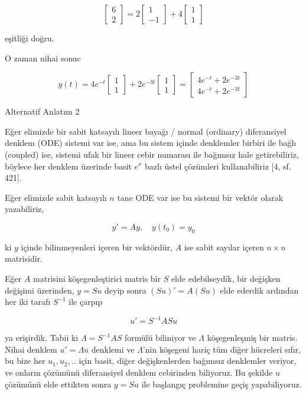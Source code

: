 \documentclass[12pt,fleqn]{article}\usepackage{../../common}
\begin{document}
$$
\left[\begin{array}{r}
6 \\ 2
\end{array}\right] =
2 
\left[\begin{array}{r}
1 \\ -1
\end{array}\right] +
4 
\left[\begin{array}{r}
1 \\ 1
\end{array}\right] 
$$

eşitliği doğru. 

O zaman nihai sonuc

$$
y(t) =
4 e^{-t}
\left[\begin{array}{r}
1 \\ 1
\end{array}\right]  +
2 e^{-3t}
\left[\begin{array}{r}
1 \\ 1
\end{array}\right] =
\left[\begin{array}{r}
4 e^{-t} + 2 e^{-3t} \\
4 e^{-t} + 2 e^{-3t}
\end{array}\right]
$$

Alternatif Anlatım 2

Eğer elimizde bir sabit katsayılı lineer bayağı / normal (ordinary) diferansiyel
denklem (ODE) sistemi var ise, ama bu sistem içinde denklemler birbiri ile bağlı
(coupled) ise, sistemi ufak bir lineer cebir numarası ile bağımsız hale
getirebiliriz, böylece her denklem üzerinde basit $e^x$ bazlı üstel çözümleri
kullanabiliriz [4, sf. 421].

Eğer elimizde sabit katsayılı $n$ tane ODE var ise bu sistemi bir vektör
olarak yazabiliriz,

$$
y' = A y, \quad y(t_0) = y_0
$$

ki $y$ içinde bilinmeyenleri içeren bir vektördür, $A$ ise sabit sayılar
içeren $n \times n$ matrisidir.

Eğer $A$ matrisini köşegenleştirici matris bir $S$ elde edebilseydik, bir
değişken değişimi üzerinden, $y = Su$ deyip sonra $(Su)' = A(Su)$ elde
ederdik ardından her iki tarafı $S^{-1}$ ile çarpıp

$$
u' = S^{-1} A S u
$$

ya erişirdik. Tabii ki $\Lambda = S^{-1} A S$ formülü biliniyor ve $\Lambda$
köşegenleşmiş bir matris. Nihai denklem $u' = \Lambda u$ denklemi ve
$\Lambda$'nin köşegeni hariç tüm diğer hücreleri sıfır, bu bize her $u_1,u_2,..$
için basit, diğer değişkenlerden bağımsız denklemler veriyor, ve onların
çözümünü diferansiyel denklem cebirinden biliyoruz. Bu şekilde $u$ çözümünü
elde ettikten sonra $y = S u$ ile başlangıç problemine geçiş yapabiliyoruz. 
\end{document}
